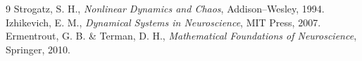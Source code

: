 \documentclass[11pt,a4paper]{article}
\begin{document}
\begin{thebibliography}{9}
 Strogatz, S. H., \emph{Nonlinear Dynamics and Chaos}, Addison--Wesley, 1994.
 Izhikevich, E. M., \emph{Dynamical Systems in Neuroscience}, MIT Press, 2007.
 Ermentrout, G. B. \& Terman, D. H., \emph{Mathematical Foundations of Neuroscience}, Springer, 2010.
\end{thebibliography}
\end{document}
